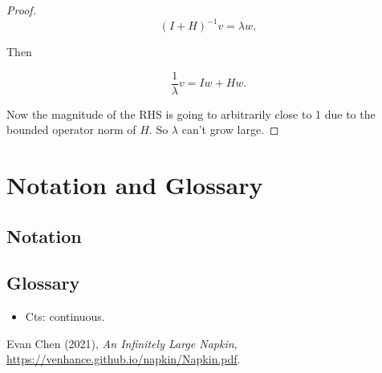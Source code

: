 \documentclass[11pt]{scrartcl}
\begin{document}
\begin{example}
\begin{proof}
    \begin{equation}
        (I+H)^{-1} v = \lambda w,
    \end{equation}

    Then

    \begin{equation}
        \frac{1}{\lambda} v = Iw + Hw.
    \end{equation}

    Now the magnitude of the RHS is going to arbitrarily close to 1 due to the bounded operator norm of $H$. So $\lambda$ can't grow large.
\end{proof}
\end{example}


\section{Notation and Glossary}

\subsection{Notation}

\subsection{Glossary}

\begin{itemize}
    \item Cts: continuous.
\end{itemize}

\begin{thebibliography}{9}
    Evan Chen (2021), \emph{An Infinitely Large Napkin}, \url{https://venhance.github.io/napkin/Napkin.pdf}.
\end{thebibliography}    
\end{document}
